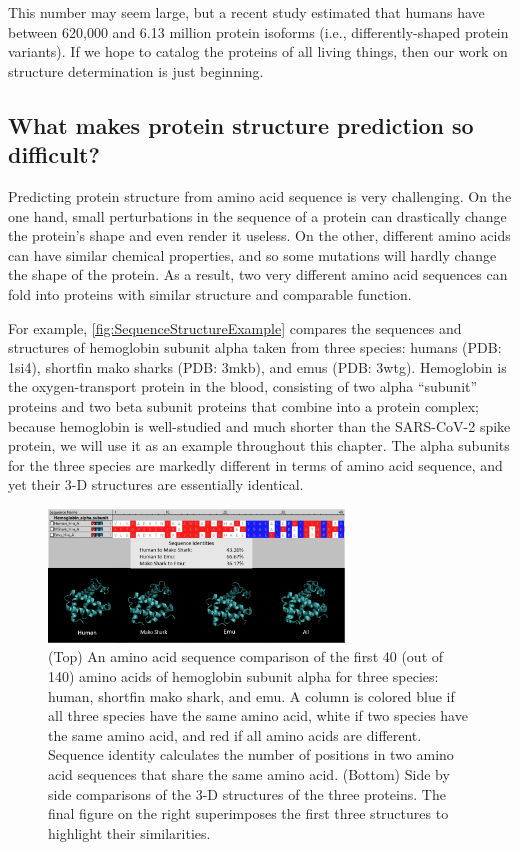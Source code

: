 This number may seem large, but a recent study estimated that humans have between 620,000 and 6.13 million protein isoforms (i.e., differently-shaped protein variants). If we hope to catalog the proteins of all living things, then our work on structure determination is just beginning.

\FloatBarrier
{}
\subsection{What makes protein structure prediction so difficult?}

Predicting protein structure from amino acid sequence is very challenging. On the one hand, small perturbations in the sequence of a protein can drastically change the protein's shape and even render it useless. On the other, different amino acids can have similar chemical properties, and so some mutations will hardly change the shape of the protein. As a result, two very different amino acid sequences can fold into proteins with similar structure and comparable function.

For example, \autoref{fig:SequenceStructureExample} compares the sequences and structures of hemoglobin subunit alpha taken from three species: humans (PDB: 1si4), shortfin mako sharks (PDB: 3mkb), and emus (PDB: 3wtg). Hemoglobin is the oxygen-transport protein in the blood, consisting of two alpha ``subunit'' proteins and two beta subunit proteins that combine into a protein complex; because hemoglobin is well-studied and much shorter than the SARS-CoV-2 spike protein, we will use it as an example throughout this chapter. The alpha subunits for the three species are markedly different in terms of amino acid sequence, and yet their 3-D structures are essentially identical.

\begin{figure}[h]
	\centering
	\mySfFamily
	\includegraphics[width = 0.7\textwidth]{../images/SequenceStructureExample.png}
	\caption{(Top) An amino acid sequence comparison of the first 40 (out of 140) amino acids of hemoglobin subunit alpha for three species: human, shortfin mako shark, and emu. A column is colored blue if all three species have the same amino acid, white if two species have the same amino acid, and red if all amino acids are different. Sequence identity calculates the number of positions in two amino acid sequences that share the same amino acid. (Bottom) Side by side comparisons of the 3-D structures of the three proteins. The final figure on the right superimposes the first three structures to highlight their similarities.}
	\label{fig:SequenceStructureExample}
\end{figure}

